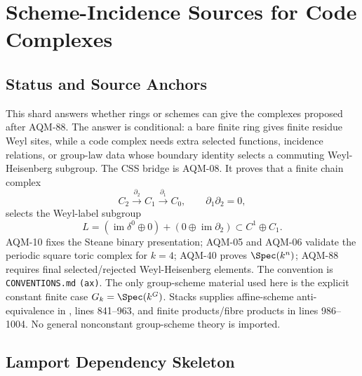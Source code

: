 
\section{Scheme-Incidence Sources for Code Complexes}
\label{sec:scheme-incidence-code-sources}

\subsection{Status and Source Anchors}
This shard answers whether rings or schemes can give the complexes proposed
after AQM-88.  The answer is conditional: a bare finite ring gives finite
residue Weyl sites, while a code complex needs extra selected functions,
incidence relations, or group-law data whose boundary identity selects a
commuting Weyl-Heisenberg subgroup.  The CSS bridge is AQM-08.  It proves that
a finite chain complex
\[
  C_2\xrightarrow{\partial_2}C_1\xrightarrow{\partial_1}C_0,
  \qquad \partial_1\partial_2=0,
\]
selects the Weyl-label subgroup
\[
  L=(\operatorname{im}\delta^0\oplus0)+(0\oplus\operatorname{im}\partial_2)
  \subset C^1\oplus C_1 .
\]
AQM-10 fixes the Steane binary presentation; AQM-05 and AQM-06 validate the
periodic square toric complex for \(k=4\); AQM-40 proves
\(\Spec(k^n)\); AQM-88 requires final selected/rejected Weyl-Heisenberg
elements.  The convention is \texttt{CONVENTIONS.md} \texttt{(ax)}.  The only
group-scheme material used here is the explicit constant finite case
\(G_k=\Spec(k^G)\).  Stacks supplies affine-scheme anti-equivalence in
, lines
841--963, and finite products/fibre products in lines 986--1004.  No general
nonconstant group-scheme theory is imported.

\subsection{Lamport Dependency Skeleton}


